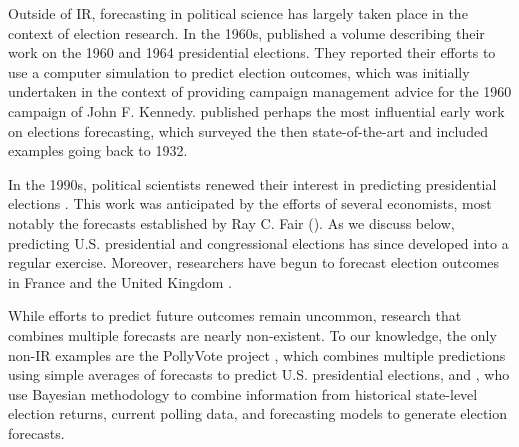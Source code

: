 Outside of IR, forecasting in political science has largely taken
place in the context of election research.  %
In the 1960s, \citet{Pool:1964} published a volume describing their
work on the 1960 and 1964 presidential elections. They reported their
efforts to use a computer simulation to predict election outcomes,
which was initially undertaken in the context of providing campaign
management advice for the 1960 campaign of John F. Kennedy.
\citet{Rosenstone:1983} published perhaps the most influential early
work on elections forecasting, which surveyed the then state-of-the-art
and included examples going back to 1932.


In the 1990s, political scientists renewed their interest in
predicting presidential elections \citep{Campbell:1990,
  Campbell:1992}. This work was anticipated by the efforts of several
economists, most notably the forecasts established by Ray C. Fair
(\citeyear{Fair:1978}). As we discuss below, predicting
U.S. presidential and congressional elections has since developed into
a regular exercise.  Moreover, researchers have begun to forecast
election outcomes in France \citep[e.g.,][]{Jerome:1999} and the
United Kingdom
\citep[e.g.,][]{Whitely:2005}. 


While efforts to predict future outcomes remain uncommon, research
that combines multiple forecasts are nearly non-existent.  To our
knowledge, the only non-IR examples are the PollyVote project
\citep[c.f.][]{Graefe:2010}, which combines multiple predictions using
simple averages of forecasts to predict U.S. presidential elections,
and \citet{gelman:forecasts}, who use Bayesian methodology to combine
information from historical state-level election returns, current
polling data, and forecasting models to generate election forecasts.


